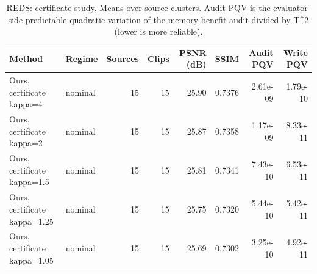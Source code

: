 \begin{table}[t]
\centering
\caption{REDS: certificate study. Means over source clusters. Audit PQV is the evaluator-side predictable quadratic variation of the memory-benefit audit divided by T^2 (lower is more reliable).}
\label{tab:certificate_REDS}
\small
\begin{tabular}{llrrrrrr}
\toprule
Method & Regime & Sources & Clips & PSNR (dB) & SSIM & Audit PQV & Write PQV \\
\midrule
Ours, certificate kappa=4 & nominal & 15 & 15 & 25.90 & 0.7376 & 2.61e-09 & 1.79e-10 \\
Ours, certificate kappa=2 & nominal & 15 & 15 & 25.87 & 0.7358 & 1.17e-09 & 8.33e-11 \\
Ours, certificate kappa=1.5 & nominal & 15 & 15 & 25.81 & 0.7341 & 7.43e-10 & 6.53e-11 \\
Ours, certificate kappa=1.25 & nominal & 15 & 15 & 25.75 & 0.7320 & 5.44e-10 & 5.42e-11 \\
Ours, certificate kappa=1.05 & nominal & 15 & 15 & 25.69 & 0.7302 & 3.25e-10 & 4.92e-11 \\
\bottomrule
\end{tabular}
\end{table}
